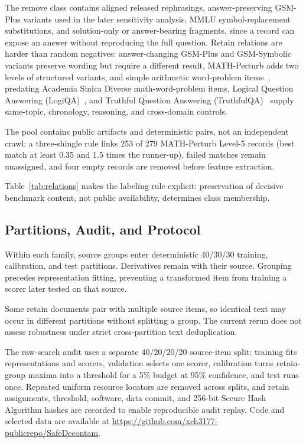 \documentclass[conference]{IEEEtran}
\begin{document}
The remove class contains aligned released rephrasings, answer-preserving GSM-Plus variants used in the later sensitivity analysis, MMLU symbol-replacement substitutions, and solution-only or answer-bearing fragments, since a record can expose an answer without reproducing the full question. Retain relations are harder than random negatives: answer-changing GSM-Plus and GSM-Symbolic variants preserve wording but require a different result, MATH-Perturb adds two levels of structured variants, and simple arithmetic word-problem items~\cite{patel2021}, predating Academia Sinica Diverse math-word-problem items, Logical Question Answering (LogiQA)~\cite{liu2020}, and Truthful Question Answering (TruthfulQA)~\cite{lin2022} supply same-topic, chronology, reasoning, and cross-domain controls.

The pool contains public artifacts and deterministic pairs, not an independent crawl: a three-shingle rule links 253 of 279 MATH-Perturb Level-5 records (best match at least 0.35 and 1.5 times the runner-up), failed matches remain unassigned, and four empty records are removed before feature extraction.

Table~\ref{tab:relations} makes the labeling rule explicit: preservation of decisive benchmark content, not public availability, determines class membership.

\subsection{Partitions, Audit, and Protocol}
Within each family, source groups enter deterministic 40/30/30 training, calibration, and test partitions. Derivatives remain with their source. Grouping precedes representation fitting, preventing a transformed item from training a scorer later tested on that source.

Some retain documents pair with multiple source items, so identical text may occur in different partitions without splitting a group. The current rerun does not assess robustness under strict cross-partition text deduplication.

The raw-search audit uses a separate 40/20/20/20 source-item split: training fits representations and scorers, validation selects one scorer, calibration turns retain-group maxima into a threshold for a 5\% budget at 95\% confidence, and test runs once. Repeated uniform resource locators are removed across splits, and retain assignments, threshold, software, data commit, and 256-bit Secure Hash Algorithm hashes are recorded to enable reproducible audit replay. Code and selected data are available at \url{https://github.com/xch3177-publicrepo/SafeDecontam}.
\end{document}
